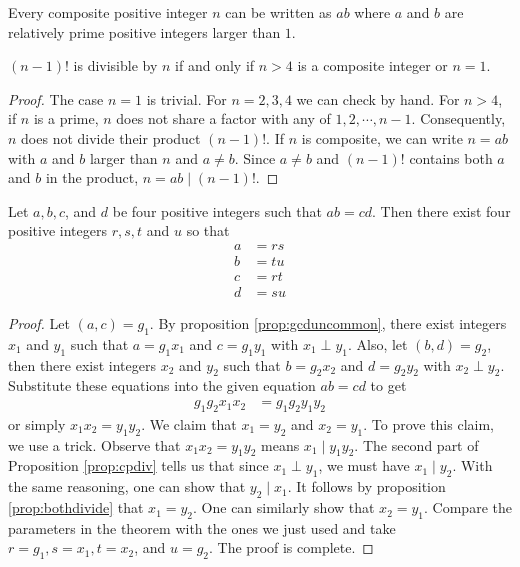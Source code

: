 \begin{theorem}
	Every composite positive integer $n$ can be written as $ab$ where $a$ and $b$ are relatively prime positive integers larger than $1$.
\end{theorem}

\begin{theorem}
	$(n-1)!$ is divisible by $n$ if and only if $n>4$ is a composite integer or $n=1$.\label{thm:cpfct}
\end{theorem}

\begin{proof}
	The case $n=1$ is trivial. For $n=2,3,4$ we can check by hand. For $n>4$, if $n$ is a prime, $n$ does not share a factor with any of $1,2,\cdots,n-1$. Consequently, $n$ does not divide their product $(n-1)!$. If $n$ is composite, we can write $n=ab$ with $a$ and $b$ larger than $n$ and $a\neq b$. Since $a\neq b$ and $(n-1)!$ contains both $a$ and $b$ in the product, $n=ab\mid (n-1)!$.
\end{proof}

\begin{theorem}
	Let $a, b, c$, and $d$ be four positive integers such that $ab=cd$. Then there exist four positive integers $r,s,t$ and $u$ so that
	\begin{align*}
		a
			& = rs\\
		b
			& = tu\\
		c
			& = rt\\
		d
			& = su
	\end{align*}
\end{theorem}

\begin{proof}
	Let $(a,c)=g_1$. By proposition \eqref{prop:gcduncommon}, there exist integers $x_1$ and $y_1$ such that $a=g_1x_1$ and $c=g_1y_1$ with $x_1\perp y_1$. Also, let $(b,d)=g_2$, then there exist integers $x_2$ and $y_2$ such that $b=g_2x_2$ and $d=g_2y_2$ with $x_2\perp y_2$. Substitute these equations into the given equation $ab=cd$ to get
	\begin{align*}
		g_1g_2x_1x_2 & =g_1g_2y_1y_2
	\end{align*}
	or simply $x_1x_2 =y_1y_2$. We claim that $x_1=y_2$ and $x_2=y_1$. To prove this claim, we use a trick. Observe that $x_1x_2=y_1y_2$ means $x_1\mid y_1y_2$. The second part of Proposition \eqref{prop:cpdiv} tells us that since $x_1 \perp y_1$, we must have $x_1\mid y_2$. With the same reasoning, one can show that $y_2\mid x_1$. It follows by proposition \eqref{prop:bothdivide} that $x_1 =y_2$. One can similarly show that $x_2=y_1$. Compare the  parameters in the theorem with the ones we just used and take $r=g_1, s=x_1, t=x_2 $, and $u=g_2$. The proof is complete.
\end{proof}

